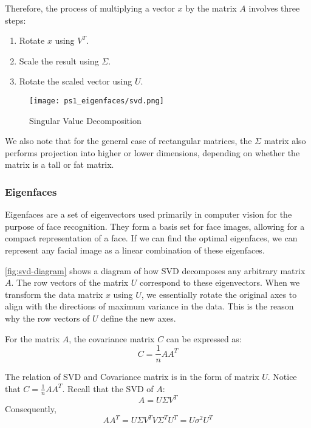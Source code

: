\documentclass{article} %
\theoremstyle{definition}
\theoremstyle{remark}
\theoremstyle{plain}
\begin{document}
        Therefore, the process of multiplying a vector \(x\) by the matrix \(A\) involves three steps:
        \begin{enumerate}
            \item Rotate \(x\) using \(V^T\).
            \item Scale the result using \(\Sigma\).
            \item Rotate the scaled vector using \(U\).
        \end{enumerate}

        \begin{figure}[h!]
            \centering
            \texttt{[image: ps1\_eigenfaces/svd.png]}
            \caption{Singular Value Decomposition}
            \label{fig:svd-diagram}
        \end{figure}

    We also note that for the general case of rectangular matrices, the $\Sigma$ matrix also performs projection into higher or lower dimensions, depending on whether the matrix is a tall or fat matrix.

    \subsubsection{Eigenfaces}
        Eigenfaces are a set of eigenvectors used primarily in computer vision for the purpose of face recognition. They form a basis set for face images, allowing for a compact representation of a face. If we can find the optimal eigenfaces, we can represent any facial image as a linear combination of these eigenfaces.

        \autoref{fig:svd-diagram} shows a diagram of how SVD decomposes any arbitrary matrix $A$. The row vectors of the matrix \(U\) correspond to these eigenvectors. When we transform the data matrix \(x\) using \(U\), we essentially rotate the original axes to align with the directions of maximum variance in the data. This is the reason why the row vectors of \(U\) define the new axes.

        For the matrix \(A\), the covariance matrix \(C\) can be expressed as:
        \[
        C = \frac{1}{n}AA^T
        \]

        The relation of SVD and Covariance matrix is in the form of matrix \(U\). Notice that \(C = \frac{1}{n}AA^T\). Recall that the SVD of \(A\):
        \[
        A = U \Sigma V^T
        \]
        Consequently,
        \[
        AA^T = U\Sigma V^T V \Sigma^T U^T = U \sigma^2 U^T
        \]
\end{document}
